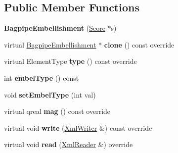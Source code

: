 \subsection*{Public Member Functions}
\begin{DoxyCompactItemize}
\item 
\mbox{\label{class_ms_1_1_bagpipe_embellishment_aeb9259f8f00bb4ce01e999dfedbe585e}} 
{\bfseries Bagpipe\+Embellishment} (\hyperlink{class_ms_1_1_score}{Score} $\ast$s)
\item 
\mbox{\label{class_ms_1_1_bagpipe_embellishment_a169b60797ce4798cb9f4af0af5efb0f1}} 
virtual \hyperlink{class_ms_1_1_bagpipe_embellishment}{Bagpipe\+Embellishment} $\ast$ {\bfseries clone} () const override
\item 
\mbox{\label{class_ms_1_1_bagpipe_embellishment_a707d9f4c584bb890e17ef6ce19a66576}} 
virtual Element\+Type {\bfseries type} () const override
\item 
\mbox{\label{class_ms_1_1_bagpipe_embellishment_af81d416c899ebdcb9ee794f40c854101}} 
int {\bfseries embel\+Type} () const
\item 
\mbox{\label{class_ms_1_1_bagpipe_embellishment_afaebd105e5bd5976d4b6776bf90adb94}} 
void {\bfseries set\+Embel\+Type} (int val)
\item 
\mbox{\label{class_ms_1_1_bagpipe_embellishment_ade39512592e40545591f232d3ae2626b}} 
virtual qreal {\bfseries mag} () const override
\item 
\mbox{\label{class_ms_1_1_bagpipe_embellishment_a2765f1bbb296c7150c3995fe05388ca1}} 
virtual void {\bfseries write} (\hyperlink{class_ms_1_1_xml_writer}{Xml\+Writer} \&) const override
\item 
\mbox{\label{class_ms_1_1_bagpipe_embellishment_afda07f37ef3e0132d049bba9bf8bcc7c}} 
virtual void {\bfseries read} (\hyperlink{class_ms_1_1_xml_reader}{Xml\+Reader} \&) override
\item 

\end{DoxyCompactItemize}
